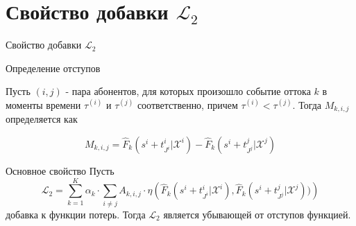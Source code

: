 \documentclass[10pt,pdf,hyperref={unicode}]{beamer}
\begin{document}
\section{Свойство добавки $\mathcal{L}_2$}
\begin{frame}{Свойство добавки $\mathcal{L}_2$}
	
\begin{block}{Определение отступов}
	
		Пусть $(i,j)$ - пара абонентов, для которых произошло событие оттока $k$ в моменты времени $\tau^{(i)}$ и $\tau^{(j)}$ соответственно, причем $\tau^{(i)} < \tau^{(j)}$. Тогда $M_{k,i,j}$ определяется как
		
		$$M_{k,i,j} = \hat{F}_k(s^i+t_{J^i}^i|\mathcal{X}^i) - \hat{F}_k(s^i+t_{J^j}^j|\mathcal{X}^j)$$
		
\end{block}


\begin{block}{Основное свойство}
	Пусть $$\mathcal{L}_2 =\sum_{k=1}^K\alpha_k\cdot\sum_{i\neq j}A_{k,i,j}\cdot\eta\left(\hat{F}_k(s^i+t_{J^i}^i|\mathcal{X}^i) , \hat{F}_k(s^i+t_{J^j}^j|\mathcal{X}^j))\right)$$ добавка к функции потерь. Тогда $\mathcal{L}_2$ является убывающей от отступов функцией.  
\end{block}

\end{frame}
\end{document}
